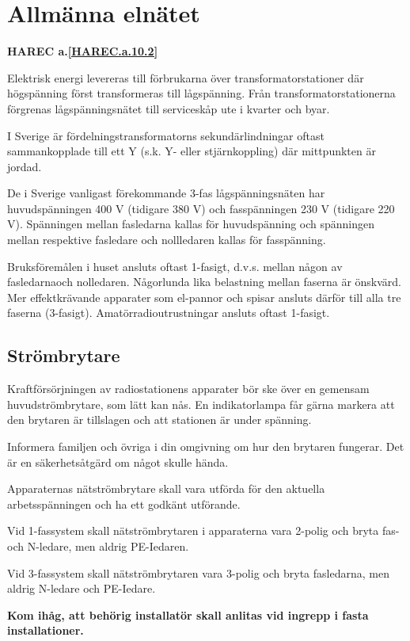 \section{Allmänna elnätet}
\textbf{
HAREC a.\ref{HAREC.a.10.2}\label{myHAREC.a.10.2}
}
\label{jordning}

Elektrisk energi levereras till förbrukarna över
transformatorstationer där högspänning först transformeras till
lågspänning. Från transformatorstationerna förgrenas lågspänningsnätet
till serviceskåp ute i kvarter och byar.

I Sverige är fördelningstransformatorns sekundärlindningar oftast
sammankopplade till ett Y (s.k. Y- eller stjärnkoppling) där
mittpunkten är jordad.

De i Sverige vanligast förekommande 3-fas lågspänningsnäten har
huvudspänningen 400 V (tidigare 380 V) och fasspänningen 230 V
(tidigare 220 V). Spänningen mellan fasledarna kallas för
huvudspänning och spänningen mellan respektive fasledare och
nollledaren kallas för fasspänning.

Bruksföremålen i huset ansluts oftast 1-fasigt, d.v.s. mellan någon av
fasledarnaoch nolledaren. Någorlunda lika belastning mellan faserna är
önskvärd.  Mer effektkrävande apparater som el-pannor och spisar
ansluts därför till alla tre faserna (3-fasigt).
Amatörradioutrustningar ansluts oftast 1-fasigt.

\subsection{Strömbrytare}

Kraftförsörjningen av radiostationens apparater bör ske över en
gemensam huvudströmbrytare, som lätt kan nås. En indikatorlampa får
gärna markera att den brytaren är tillslagen och att stationen är
under spänning.

Informera familjen och övriga i din omgivning om hur den brytaren
fungerar. Det är en säkerhetsåtgärd om något skulle hända.

Apparaternas nätströmbrytare skall vara utförda för den aktuella
arbetsspänningen och ha ett godkänt utförande.

Vid 1-fassystem skall nätströmbrytaren i apparaterna vara 2-polig och
bryta fas- och N-ledare, men aldrig PE-Iedaren.

Vid 3-fassystem skall nätströmbrytaren
vara 3-polig och bryta fasledarna, men aldrig
N-ledare och PE-Iedare.

\textbf{Kom ihåg, att behörig installatör skall
  anlitas vid ingrepp i fasta installationer.}

